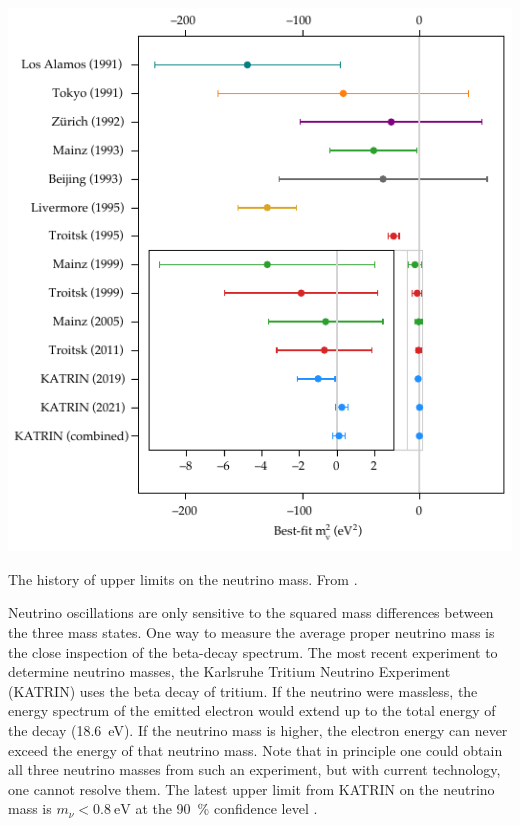 \documentclass[
    a4paper, %
    fontsize=10pt, %
    twoside=false, %
    numbers=noenddot, %
    fontmethod=tex,
]{kaobook}
\begin{document}
\begin{marginfigure}
    \includegraphics{theory/mass_history.pdf}
    \caption[Neutrino mass upper limit history]{The history of upper limits on the neutrino mass. From \cite{Aker2022}.}
\end{marginfigure}

Neutrino oscillations are only sensitive to the squared mass differences between the three mass states. One way to measure the average proper neutrino mass is the close inspection of the beta-decay spectrum. The most recent experiment to determine neutrino masses, the Karlsruhe Tritium Neutrino Experiment (KATRIN) uses the beta decay of tritium. If the neutrino were massless, the energy spectrum of the emitted electron would extend up to the total energy of the decay (\SI{18.6}{\eV}). If the neutrino mass is higher, the electron energy can never exceed the energy of that neutrino mass. Note that in principle one could obtain all three neutrino masses from such an experiment, but with current technology, one cannot resolve them. The latest upper limit from KATRIN on the neutrino mass is $m_\nu < \SI{0.8}{\eV}$ at the \SI{90}{\percent} confidence level .
\end{document}
